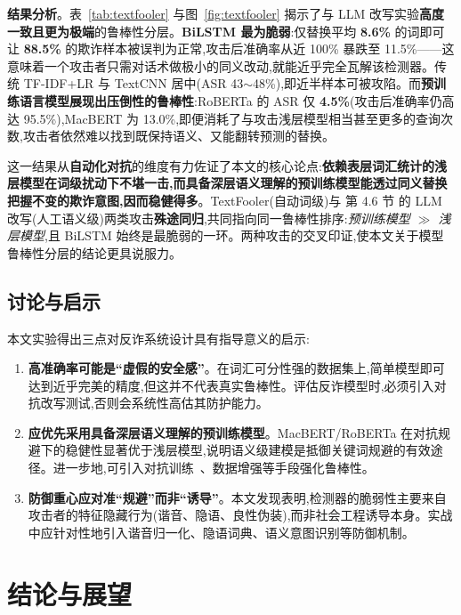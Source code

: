 \documentclass[11pt,a4paper]{article}
\begin{document}
\textbf{结果分析}。表~\ref{tab:textfooler} 与图~\ref{fig:textfooler} 揭示了与 LLM 改写实验\textbf{高度一致且更为极端}的鲁棒性分层。\textbf{BiLSTM 最为脆弱}:仅替换平均 \textbf{8.6\%} 的词即可让 \textbf{88.5\%} 的欺诈样本被误判为正常,攻击后准确率从近 100\% 暴跌至 11.5\%——这意味着一个攻击者只需对话术做极小的同义改动,就能近乎完全瓦解该检测器。传统 TF-IDF+LR 与 TextCNN 居中(ASR 43$\sim$48\%),即近半样本可被攻陷。而\textbf{预训练语言模型展现出压倒性的鲁棒性}:RoBERTa 的 ASR 仅 \textbf{4.5\%}(攻击后准确率仍高达 95.5\%),MacBERT 为 13.0\%,即便消耗了与攻击浅层模型相当甚至更多的查询次数,攻击者依然难以找到既保持语义、又能翻转预测的替换。

这一结果从\textbf{自动化对抗}的维度有力佐证了本文的核心论点:\textbf{依赖表层词汇统计的浅层模型在词级扰动下不堪一击,而具备深层语义理解的预训练模型能透过同义替换把握不变的欺诈意图,因而稳健得多}。TextFooler(自动词级)与 第 4.6 节 的 LLM 改写(人工语义级)两类攻击\textbf{殊途同归},共同指向同一鲁棒性排序:\emph{预训练模型 $\gg$ 浅层模型},且 BiLSTM 始终是最脆弱的一环。两种攻击的交叉印证,使本文关于模型鲁棒性分层的结论更具说服力。

\subsection{讨论与启示}

本文实验得出三点对反诈系统设计具有指导意义的启示:

\begin{enumerate}[leftmargin=2em,itemsep=0.2em]
\item \textbf{高准确率可能是“虚假的安全感”}。在词汇可分性强的数据集上,简单模型即可达到近乎完美的精度,但这并不代表真实鲁棒性。评估反诈模型时,必须引入对抗改写测试,否则会系统性高估其防护能力。
\item \textbf{应优先采用具备深层语义理解的预训练模型}。MacBERT/RoBERTa 在对抗规避下的稳健性显著优于浅层模型,说明语义级建模是抵御关键词规避的有效途径。进一步地,可引入对抗训练~\cite{advtraining2024}、数据增强等手段强化鲁棒性。
\item \textbf{防御重心应对准“规避”而非“诱导”}。本文发现表明,检测器的脆弱性主要来自攻击者的特征隐藏行为(谐音、隐语、良性伪装),而非社会工程诱导本身。实战中应针对性地引入谐音归一化、隐语词典、语义意图识别等防御机制。
\end{enumerate}

\section{结论与展望}
\end{document}
